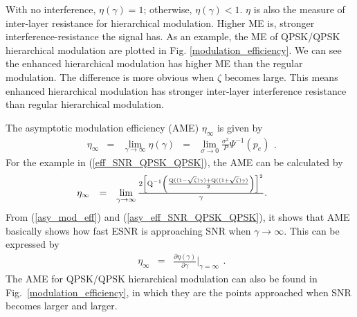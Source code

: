 \documentclass[conference]{IEEEtran}
\begin{document}
\noindent With no interference, $\eta\left(\gamma\right)=1$;
otherwise, $\eta\left(\gamma\right)<1$. $\eta$ is also the measure
of inter-layer resistance for hierarchical modulation. Higher ME
is, stronger interference-resistance the signal has. As an
example, the ME of QPSK/QPSK hierarchical modulation are plotted
in Fig. \ref{modulation_efficiency}. We can see the enhanced
hierarchical modulation has higher ME than the regular modulation.
The difference is more obvious when $\zeta$ becomes large. This
means enhanced hierarchical modulation has stronger inter-layer
interference resistance than regular hierarchical modulation.
\begin{figure}
\end{figure}

The asymptotic modulation efficiency (AME) $\eta_{\infty}$ is
given by
\begin{equation}
\begin{array}{rcccl}
\eta_{\infty}&=&\lim\limits_{\gamma\rightarrow\infty}\eta\left(\gamma\right)&=&\lim\limits_{\sigma\rightarrow0}\frac{\sigma^2}{P}\Psi^{-1}\left(p_{e}\right)
\end{array}.\label{asy_mod_eff}
\end{equation}
\noindent For the example in (\ref{eff_SNR_QPSK_QPSK}), the AME
can be calculated by
\begin{equation}\hspace{-0.225in}
\begin{array}{rcl}
\eta_{\infty}&=&\lim\limits_{\gamma\rightarrow\infty}\frac{2\left[{\rm
Q}^{-1}\left(\frac{{\rm Q}((1-\sqrt{\zeta})\gamma)+{\rm
Q}((1+\sqrt{\zeta})\gamma)}{2}\right)\right]^2}{\gamma}.
\end{array}\label{asy_eff_SNR_QPSK_QPSK}
\end{equation}
\noindent From (\ref{asy_mod_eff}) and
(\ref{asy_eff_SNR_QPSK_QPSK}), it shows that AME basically shows
how fast ESNR is approaching SNR when $\gamma\rightarrow\infty$.
This can be expressed by
\begin{equation}
\begin{array}{rcl}
\eta_{\infty}&=&\frac{\partial\eta\left(\gamma\right)}{\partial\gamma}|_{\gamma=\infty}
\end{array}.\label{asy_mod_eff2}
\end{equation}
\noindent The AME for QPSK/QPSK hierarchical modulation can also
be found in Fig.~\ref{modulation_efficiency}, in which they are
the points approached when SNR becomes larger and larger.
\end{document}
